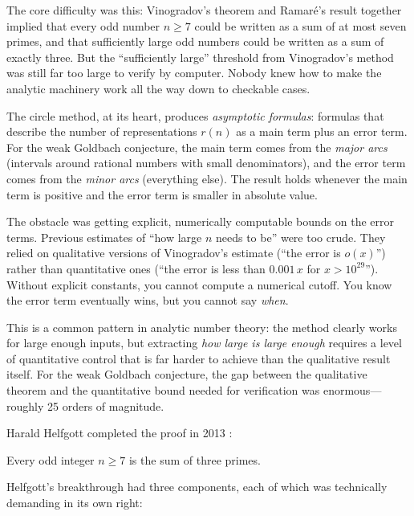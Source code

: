 The core difficulty was this: Vinogradov's theorem and Ramar\'e's result together implied that every odd number $n \geq 7$ could be written as a sum of at most seven primes, and that sufficiently large odd numbers could be written as a sum of exactly three. But the ``sufficiently large'' threshold from Vinogradov's method was still far too large to verify by computer. Nobody knew how to make the analytic machinery work all the way down to checkable cases.

The circle method, at its heart, produces \emph{asymptotic formulas}: formulas that describe the number of representations $r(n)$ as a main term plus an error term. For the weak Goldbach conjecture, the main term comes from the \emph{major arcs} (intervals around rational numbers with small denominators), and the error term comes from the \emph{minor arcs} (everything else). The result holds whenever the main term is positive and the error term is smaller in absolute value.

The obstacle was getting explicit, numerically computable bounds on the error terms. Previous estimates of ``how large $n$ needs to be'' were too crude. They relied on qualitative versions of Vinogradov's estimate (``the error is $o(x)$'') rather than quantitative ones (``the error is less than $0.001\,x$ for $x > 10^{29}$''). Without explicit constants, you cannot compute a numerical cutoff. You know the error term eventually wins, but you cannot say \emph{when}.

This is a common pattern in analytic number theory: the method clearly works for large enough inputs, but extracting \emph{how large is large enough} requires a level of quantitative control that is far harder to achieve than the qualitative result itself. For the weak Goldbach conjecture, the gap between the qualitative theorem and the quantitative bound needed for verification was enormous---roughly 25 orders of magnitude.

Harald Helfgott completed the proof in 2013 \cite{helfgott2013}:

\begin{theorem}
Every odd integer $n \geq 7$ is the sum of three primes.
\end{theorem}

Helfgott's breakthrough had three components, each of which was technically demanding in its own right:

